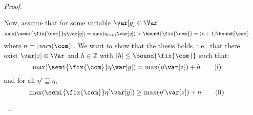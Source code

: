 \begin{proof}
\begin{inductive}
    Now, assume that for some variable \(\var[y] \in \Var\)
    \[\max(\semi{\fix{\com}} \eta \var[y]) = \max(\eta_{m+1} \var[y]) >
      \bound{\fix{\com}} = (n+1) \bound{\com}\]
    where \(n=|\mathit{vars}(\com)|\). 
    We want to show that the thesis holds, i.e., that there exist
    \(\var[z] \in \Var\) and \(h \in \mathbb{Z}\) with
    \(|h| \leq \bound{\fix{\com}}\) such that:
    \begin{equation}\label{eq:maxendmaxstartaxio}
      \max(\semi{\fix{\com}} \eta \var[y]) = \max(\eta \var[z]) + h
      \tag{i}
    \end{equation}
    and for all \(\eta' \sqsupseteq \eta\),
    \begin{equation}\label{eq:maxmiddlemaxendaxio}
      \max(\semi{\fix{\com}} \eta' \var[y]) \geq \max(\eta' \var[z]) + h
      \tag{ii}
    \end{equation}
    

\end{inductive}
\end{proof}
